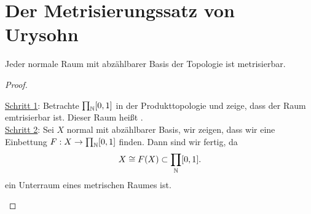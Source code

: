 \section{Der Metrisierungssatz von Urysohn}
\begin{theorem}\label{metrisierungsssatz-von-urysohn}
    Jeder normale Raum mit abzählbarer Basis der Topologie ist metrisierbar.
\end{theorem}
\begin{proof}
    \begin{strategy}
        \underline{Schritt 1}: Betrachte $\prod_{\mathbb{N}} [0,1]$ in der Produkttopologie und zeige, dass der Raum emtrisierbar ist. Dieser Raum heißt .  \\
        \underline{Schritt 2}: Sei $X$ normal mit abzählbarer Basis, wir zeigen, dass wir eine Einbettung  $F : X \to  \prod_{\mathbb{N}} [0,1]$ finden.
        Dann sind wir fertig, da 
        \[
            X \cong F(X) \subset \prod_{\mathbb{N}}[0,1]
        .\] 
        ein Unterraum eines metrischen Raumes ist.
    \end{strategy}
\end{proof}
